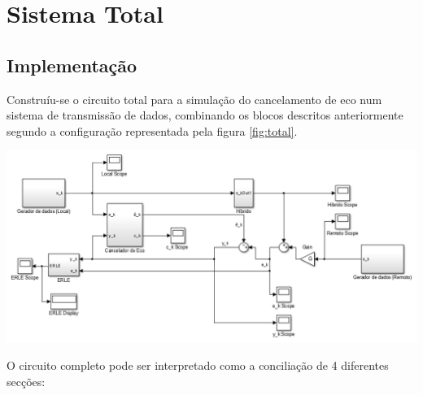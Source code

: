 \documentclass[a4paper,11pt]{report}
\begin{document}
\chapter{Sistema Total}
\section{Implementação}

Construíu-se o circuito total para a simulação do cancelamento de eco num sistema de transmissão de dados, combinando os blocos descritos anteriormente segundo a configuração representada pela figura \ref{fig:total}.

\begin{center}
     \includegraphics[angle=0,width=1.1\textwidth]{STotal.png}
     \label{fig:total}
     \end{center}


 O circuito completo pode ser interpretado como a conciliação de 4 diferentes secções:
\end{document}
